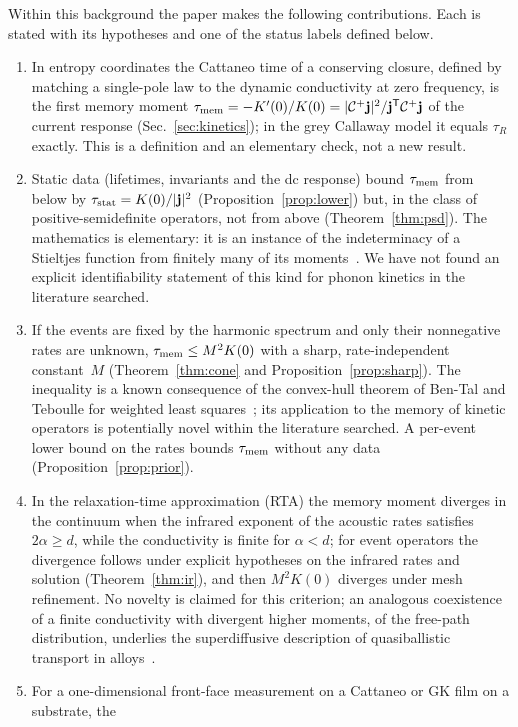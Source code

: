 Within this background the paper makes the following contributions. Each is stated with its
hypotheses and one of the status labels defined below.
\begin{enumerate}
\item In entropy coordinates the Cattaneo time of a conserving closure, defined by matching a single-pole
law to the dynamic conductivity at zero frequency, is the first memory moment
$\tau_{\rm mem}=-K'(0)/K(0)=|\mathcal C^+\mathbf j|^2/\mathbf j^{\mathsf T}\mathcal C^+\mathbf j$ of the current response (Sec.~\ref{sec:kinetics});
in the grey Callaway model it equals $\tau_R$ exactly. This is a definition and an elementary check, not a new result.
\item Static data (lifetimes, invariants and the dc response) bound $\tau_{\rm mem}$ from below by
$\tau_{\rm stat}=K(0)/|\mathbf j|^2$ (Proposition~\ref{prop:lower}) but, in the class of positive-semidefinite
operators, not from above (Theorem~\ref{thm:psd}). The mathematics is elementary: it is an instance of the
indeterminacy of a Stieltjes function from finitely many of its moments~\cite{Akhiezer2020,Schmudgen2017}.
We have not found an explicit identifiability statement of this kind for phonon kinetics in the
literature searched.
\item If the events are fixed by the harmonic spectrum and only their nonnegative rates are unknown,
$\tau_{\rm mem}\le M^2K(0)$ with a sharp, rate-independent constant~$M$ (Theorem~\ref{thm:cone} and
Proposition~\ref{prop:sharp}). The inequality is a known consequence of the convex-hull theorem of Ben-Tal and
Teboulle for weighted least squares~\cite{BenTalTeboulle1990}; its application to the memory of kinetic
operators is potentially novel within the literature searched. A per-event lower bound on the rates bounds
$\tau_{\rm mem}$ without any data (Proposition~\ref{prop:prior}).
\item In the relaxation-time approximation (RTA) the memory moment diverges in the continuum when the
infrared exponent of the acoustic rates satisfies $2\alpha\ge d$, while the conductivity is finite for
$\alpha<d$; for event operators the divergence follows under explicit hypotheses on the infrared
rates and solution (Theorem~\ref{thm:ir}), and then $M^2K(0)$ diverges under mesh refinement. No novelty is claimed
for this criterion; an analogous coexistence of a finite conductivity with divergent higher moments, of
the free-path distribution, underlies the superdiffusive description of quasiballistic transport in
alloys~\cite{Vermeersch2015a,Vermeersch2015b}.
\item For a one-dimensional front-face measurement on a Cattaneo or GK film on a substrate, the

\end{enumerate}
